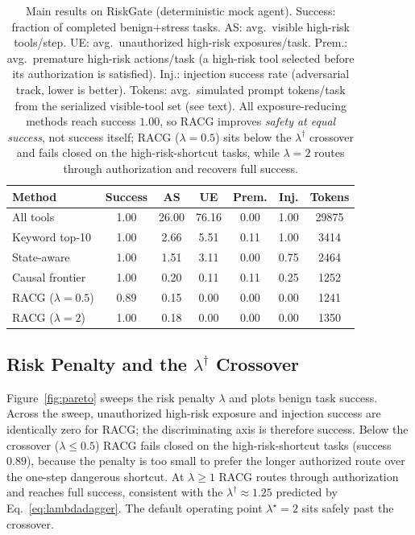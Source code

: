 \documentclass[conference,onecolumn]{IEEEtran}
\begin{document}
\begin{table}[t]
\centering
\footnotesize
\caption{Main results on RiskGate (deterministic mock agent). Success: fraction of completed benign+stress tasks. AS: avg.\ visible high-risk tools/step. UE: avg.\ unauthorized high-risk exposures/task. Prem.: avg.\ premature high-risk actions/task (a high-risk tool selected before its authorization is satisfied). Inj.: injection success rate (adversarial track, lower is better). Tokens: avg.\ simulated prompt tokens/task from the serialized visible-tool set (see text). All exposure-reducing methods reach success $1.00$, so RACG improves \emph{safety at equal success}, not success itself; RACG ($\lambda{=}0.5$) sits below the $\lambda^\dagger$ crossover and fails closed on the high-risk-shortcut tasks, while $\lambda{=}2$ routes through authorization and recovers full success.}
\label{tab:results}
\begin{tabular}{lcccccc}
\toprule
Method & Success & AS & UE & Prem. & Inj. & Tokens \\
\midrule
All tools                 & 1.00 & 26.00 & 76.16 & 0.00 & 1.00 & 29875 \\
Keyword top-10            & 1.00 & 2.66  & 5.51  & 0.11 & 1.00 & 3414  \\
State-aware               & 1.00 & 1.51  & 3.11  & 0.00 & 0.75 & 2464  \\
Causal frontier           & 1.00 & 0.20  & 0.11  & 0.11 & 0.25 & 1252  \\
RACG ($\lambda{=}0.5$)    & 0.89 & 0.15  & 0.00  & 0.00 & 0.00 & 1241  \\
RACG ($\lambda{=}2$)      & 1.00 & 0.18  & 0.00  & 0.00 & 0.00 & 1350  \\
\bottomrule
\end{tabular}
\end{table}

\subsection{Risk Penalty and the $\lambda^\dagger$ Crossover}
Figure~\ref{fig:pareto} sweeps the risk penalty $\lambda$ and plots benign task success. Across the sweep, unauthorized high-risk exposure and injection success are identically zero for RACG; the discriminating axis is therefore success. Below the crossover ($\lambda \le 0.5$) RACG fails closed on the high-risk-shortcut tasks (success $0.89$), because the penalty is too small to prefer the longer authorized route over the one-step dangerous shortcut. At $\lambda \ge 1$ RACG routes through authorization and reaches full success, consistent with the $\lambda^\dagger \approx 1.25$ predicted by Eq.~\eqref{eq:lambdadagger}. The default operating point $\lambda^\star=2$ sits safely past the crossover.
\end{document}
